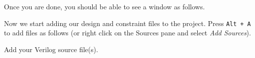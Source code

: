 \documentclass[11pt]{article}
\begin{document}
\begin{center}
\end{center}

Once you are done, you should be able to see a window as follows.

\begin{center}
\end{center}

Now we start adding our design and constraint files to the project. Press \texttt{Alt + A} to add files as follows (or right click on the Sources pane and select \emph{Add Sources}).

\begin{center}
\end{center}

Add your Verilog source file(s).

\begin{center}
\end{center}
\end{document}
